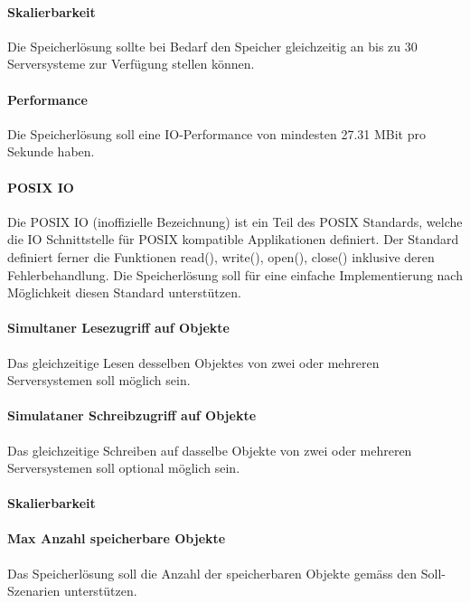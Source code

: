 \paragraph{Skalierbarkeit}\label{Soll-3-1}
Die Speicherlösung sollte bei Bedarf den Speicher gleichzeitig an bis zu 30 Serversysteme zur Verfügung stellen können.

\paragraph{Performance}\label{Soll-3-2}
Die Speicherlösung soll eine IO-Performance von mindesten 27.31 MBit pro Sekunde haben.

\paragraph{POSIX IO}\label{Soll-3-3}
Die POSIX IO (inoffizielle Bezeichnung) ist ein Teil des POSIX Standards, welche die IO Schnittstelle für POSIX kompatible Applikationen definiert. Der Standard definiert ferner die Funktionen read(), write(), open(), close() inklusive deren Fehlerbehandlung. Die Speicherlösung soll für eine einfache Implementierung nach Möglichkeit diesen Standard unterstützen. 

\paragraph{Simultaner Lesezugriff auf Objekte}\label{Soll-3-4}
Das gleichzeitige Lesen desselben Objektes von zwei oder mehreren Serversystemen soll möglich sein.

\paragraph{Simulataner Schreibzugriff auf Objekte}\label{Soll-3-5}
Das gleichzeitige Schreiben auf dasselbe Objekte von zwei oder mehreren Serversystemen soll optional möglich sein.


\renewcommand\theparagraph{Soll-4-\arabic{paragraph}}
\setcounter{paragraph}{0}

\paragraph{Skalierbarkeit}\label{Soll-4-1}

\paragraph{Max Anzahl speicherbare Objekte}\label{Soll-4-2}
Das Speicherlösung soll die Anzahl der speicherbaren Objekte gemäss den Soll-Szenarien unterstützen. 


